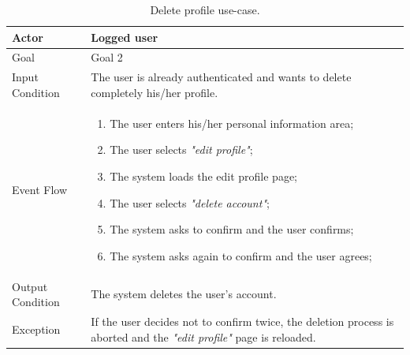 \begin{table}[H]
\begin{center}
\begin{tabular}{p{} | p{}}
\hline
Actor & Logged user\\
\hline
Goal & Goal 2\\
\hline
Input Condition & The user is already authenticated and wants to delete completely his/her profile.\\
\hline
Event Flow & 
\begin{enumerate}
\item The user enters his/her personal information area;
\item The user selects \emph{"edit profile"};
\item The system loads the edit profile page;
\item The user selects \emph{"delete account"};
\item The system asks to confirm and the user confirms;
\item The system asks again to confirm and the user agrees;
\end{enumerate} \\
\hline
Output Condition & The system deletes the user's account.\\
\hline
Exception & If the user decides not to confirm twice, the deletion process is aborted and the \emph{"edit profile"} page is reloaded.\\
\hline
\end{tabular}
\end{center}
\caption{Delete profile use-case.}
\label{delete_profile_uc}
\end{table}